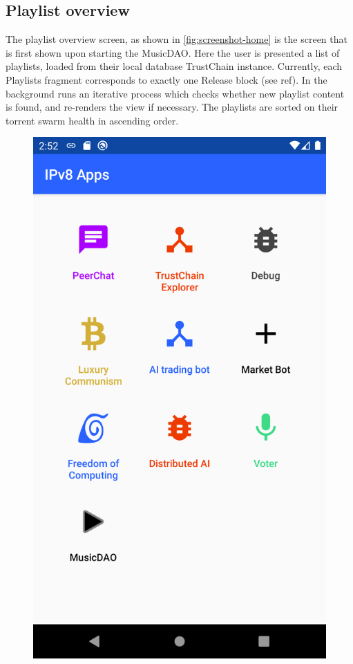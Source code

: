 \subsection{Playlist overview}
The playlist overview screen, as shown in \ref{fig:screenshot-home} is the screen that is first shown upon starting the MusicDAO. Here the user is presented a list of playlists, loaded from their local database TrustChain instance. Currently, each Playlists fragment corresponds to exactly one Release block (see ref). In the background runs an iterative process which checks whether new playlist content is found, and re-renders the view if necessary. The playlists are sorted on their torrent swarm health in ascending order. 
\begin{figure}
        \includegraphics[width=1\linewidth]{implementation/screenshot-superapp.png}

\end{figure}
